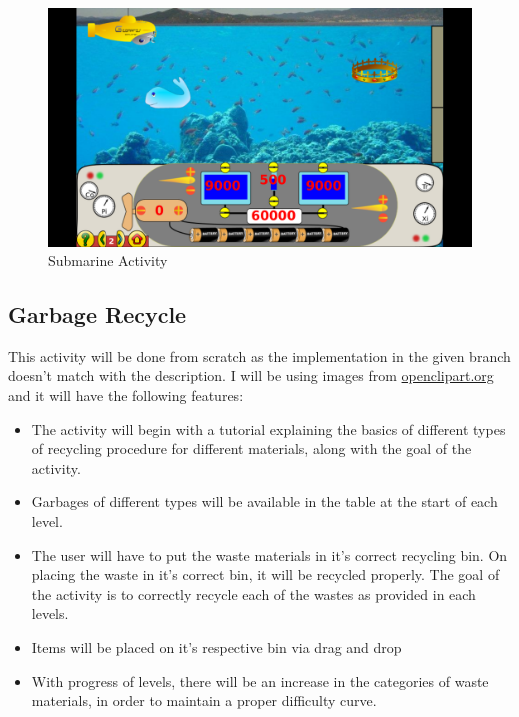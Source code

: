 \documentclass[preprint,12pt]{elsarticle}
\begin{document}
\begin{itemize}
\begin{figure}[h]
\centering\includegraphics[width=1.0\linewidth]{submarine}
\caption{Submarine Activity}
\end{figure}

\end{itemize}
\subsection{Garbage Recycle}

This activity will be done from scratch as the implementation in the given branch doesn't match with the description. I will be using images from \href{https://openclipart.org/}{openclipart.org} and it will have the following features:

\begin{itemize}

\item The activity will begin with a tutorial explaining the basics of different types of recycling procedure for different materials, along with the goal of the activity.

\item Garbages of different types will be available in the table at the start of each level.

\item The user will have to put the waste materials in it's correct recycling bin. On placing the waste in it's correct bin, it will be recycled properly. The goal of the activity is to correctly recycle each of the wastes as provided in each levels.

\item Items will be placed on it's respective bin via drag and drop

\item With progress of levels, there will be an increase in the categories of waste materials, in order to maintain a proper difficulty curve.

\end{itemize}
\end{document}
